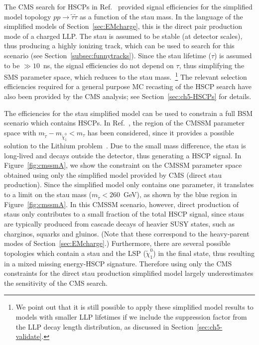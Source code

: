 The CMS search for HSCPs in Ref.~\cite{Khachatryan:2015lla}
provided signal efficiencies for the simplified model topology
$ pp \to \tilde{\tau} \tilde{\tau}$ as a function of the
stau mass. In the language of the simplified models of Section~\ref{sec:EMcharge},
this is the direct pair production mode of a charged LLP.
 The stau is assumed to be stable (at detector scales), thus
producing a highly ionizing track, which can be used to search
for this scenario (see Section~\ref{subsec:funnytracks}). 
Since the stau lifetime ($\tau$) is assumed to be $\gg
10$~ns, the signal efficiencies do not depend on $\tau$,
thus simplifying the SMS parameter space, which reduces to the stau
mass.~\footnote{We point out that it is still possible to apply these simplified
model results to models with smaller LLP lifetimes if we include the suppression
factor from the LLP decay length distribution, as
discussed in Section~\ref{sec:ch5-validate}.
}
The relevant selection efficiencies required for a general purpose
MC recasting of the HSCP search have also been provided by
the CMS analysis; see Section~\ref{sec:ch5-HSCPs} for details.

The efficiencies for the stau simplified model
can be used to constrain a full BSM scenario which contains
HSCPs. In Ref.~\cite{Heisig:2015yla}, the region of the CMSSM parameter
space with $m_{\tilde \tau} - m_{\tilde \chi_1^0} < m_{\tau}$ has been
considered, since it provides a possible solution to the Lithium
problem~\cite{Spite:1982dd, Cyburt:2008kw}. Due to the small
mass difference, the stau is long-lived and decays outside the detector,
thus generating a HSCP signal.
In Figure~\ref{fig:cmssmA}, we show the constraint on the CMSSM parameter
space obtained using only the simplified model provided by CMS (direct stau
production).
Since the simplified model only contains one parameter, it
translates to a limit on the stau mass ($m_{\tilde \tau} < 260$~GeV),
as shown by the blue region in Figure~\ref{fig:cmssmA}.
In this CMSSM scenario, however, direct production of staus only contributes to a
small fraction of the total HSCP signal, since staus are typically produced from
cascade decays of heavier SUSY states, such as charginos, squarks and gluinos. 
(Note that these correspond to the heavy-parent modes of Section~\ref{sec:EMcharge}.)
Furthermore, there are several possible topologies which contain a stau and the
LSP ($\tilde \chi_1^0$) in the final state, thus resulting in a
mixed missing energy-HSCP signature.
Therefore using only the CMS constraints for the direct stau production
simplified model largely underestimates the sensitivity of the CMS
search.

